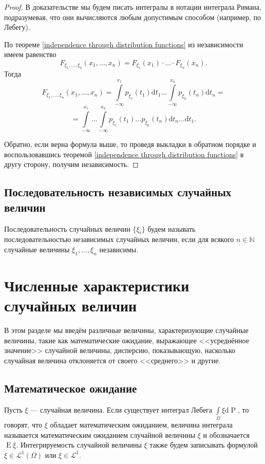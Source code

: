 \documentclass[12pt]{article}
\numberwithin{theorem}{section}
\theoremstyle{definition}
\newcommand{\defin}[2]{\hypertarget{#2}{{\color{red} #1}}}
\newcommand{\prob}{\operatorname{P}}
\newcommand{\expect}{\operatorname{E}}
\newcommand{\diff}{\mathrm{d}}
\begin{document}
	\begin{proof}
		В доказательстве мы будем писать интегралы в нотации интеграла Римана, 
		подразумевая, что они вычисляются любым допустимым способом (например, по Лебегу).
		
		По теореме \ref{independence through distribution functions} из независимости
		имеем равенство
		$$ F_{\xi_1, \ldots, \xi_n}(x_1, \ldots, x_n) = F_{\xi_1}(x_1) \cdot \ldots \cdot F_{\xi_n}(x_n). $$
		Тогда
		$$ F_{\xi_1, \ldots, \xi_n}(x_1, \ldots, x_n) 
		= \int\limits_{-\infty}^{x_1} p_{\xi_1}(t_1)\diff t_1 \ldots \int\limits_{-\infty}^{x_n} p_{\xi_n}(t_n)\diff t_n = $$
		$$ = \int\limits_{-\infty}^{x_1} \ldots \int\limits_{-\infty}^{x_n} 
		p_{\xi_1}(t_1)\ldots p_{\xi_n}(t_n) \diff t_n\ldots \diff t_1. $$
		
		Обратно, если верна формула выше,
		то проведя выкладки в обратном порядке и воспользовавшись теоремой \ref{independence through distribution functions}
		в другу сторону, получим независимость.
	\end{proof}
	
	\subsection{Последовательность независимых случайных величин}
	
	Последовательность случайных величин $ \{\xi_i\} $ будем называть 
	\defin{последовательностью независимых случайных величин}{independent-sequence},
	если для всякого $ n \in \mathbb{N} $ случайные величины $ \xi_1, \ldots, \xi_n $
	независимы.
	
	
	\section{Численные характеристики случайных величин}
	
	В этом разделе мы введём различные величины, характеризующие случайные величины,
	такие как математические ожидание, выражающее <<усреднённое значение>> случайной величины,
	дисперсию, показывающую, насколько случайная величина отклоняется от своего <<среднего>>
	и другие.
	
	\subsection{Математическое ожидание}
	
	Пусть $ \xi $ --- случайная величина. Если существует интеграл Лебега $ \int\limits_{\Omega} \xi \diff\prob $,
	то говорят, что $ \xi $ \defin{обладает математическим ожиданием}{has-expectation}, 
	величина интеграла называется \defin{математическим ожиданием случайной величины $ \xi $}{mathematical-expectation}
	и обозначается $ \expect\xi $.
	Интегрируемость случайной величины $ \xi $ также будем записывать формулой $ \xi \in \mathcal{L}^1(\Omega) $
	или $ \xi \in \mathcal{L}^1 $.
	
\end{document}
